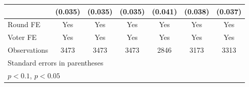 \begin{table}[htbp]
\begin{tabular}{l*{6}{c}}
                    &     (0.035)       &     (0.035)       &     (0.035)       &     (0.041)       &     (0.038)       &     (0.037)       \\
[1em]
\hline  Round FE    &         Yes       &         Yes       &         Yes       &         Yes       &         Yes       &         Yes       \\
[1em]
Voter FE            &         Yes       &         Yes       &         Yes       &         Yes       &         Yes       &         Yes       \\
\hline
Observations        &        3473       &        3473       &        3473       &        2846       &        3173       &        3313       \\
\hline\hline
\multicolumn{7}{l}{\footnotesize Standard errors in parentheses}\\
\multicolumn{7}{l}{\footnotesize \sym{+} \(p<0.1\), \sym{*} \(p<0.05\)}\\
\end{tabular}
\end{table}
